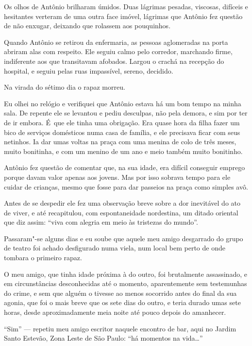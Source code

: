 Os olhos de Antônio brilharam úmidos. Duas lágrimas pesadas, viscosas,
difíceis e hesitantes verteram de uma outra face imóvel, lágrimas que
Antônio fez questão de não enxugar, deixando que rolassem aos
pouquinhos.

Quando Antônio se retirou da enfermaria, as pessoas aglomeradas na porta
abriram alas com respeito. Ele seguiu calmo pelo corredor, marchando
firme, indiferente aos que transitavam afobados. Largou o crachá na
recepção do hospital, e seguiu pelas ruas impassível, sereno, decidido.

Na virada do sétimo dia o rapaz morreu.

\asterisc{}

Eu olhei no relógio e verifiquei que Antônio estava há um bom tempo na
minha sala. De repente ele se levantou e pediu desculpas, não pela demora,
e sim por ter de ir embora. É~que ele tinha uma obrigação. Era quase
hora da filha fazer um bico de serviços domésticos numa casa de família,
e ele precisava ficar com seus netinhos. Ia dar umas voltas na praça com
uma menina de colo de três meses, muito bonitinha, e com um menino de um
ano e meio também muito bonitinho.

Antônio fez questão de comentar que, na sua idade, era difícil conseguir
emprego porque davam valor apenas aos jovens. Mas por isso sobrava tempo
para ele cuidar de crianças, mesmo que fosse para dar passeios na praça
como simples avô.

Antes de se despedir ele fez uma observação breve sobre a dor inevitável
do ato de viver, e até recapitulou, com espontaneidade nordestina, um
ditado oriental que diz assim: ``viva com alegria em meio às tristezas
do mundo''.

\asterisc{}

Passaram"-se alguns dias e eu soube que aquele meu amigo desgarrado do
grupo de teatro foi achado desfigurado numa viela, num local bem perto
de onde tombara o primeiro rapaz.

O meu amigo, que tinha idade próxima à do outro, foi brutalmente assassinado,
e em circunstâncias desconhecidas até o momento, aparentemente sem testemunhas do crime, e sem que alguém o tivesse ao menos socorrido antes do final da sua agonia, que foi o mais breve que os sete dias do outro, e teria durado umas sete horas, desde aproximadamente meia noite até pouco depois do amanhecer.

\asterisc{}

``Sim'' --- repetiu meu amigo escritor naquele encontro de bar, aqui no
Jardim Santo Estevão, Zona Leste de São Paulo: ``há momentos na
vida…''

